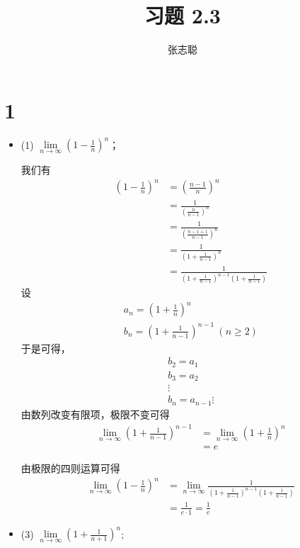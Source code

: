 \documentclass{article}
\begin{document}
\title{习题 2.3}
\author{张志聪}
\maketitle

\section*{1}

\begin{itemize}
  \item (1) $\lim\limits_{n \to \infty} \left(1 - \frac{1}{n}\right)^{n}$；

        我们有
        \begin{align*}
          \left(1 - \frac{1}{n}\right)^{n}
           & = \left(\frac{n - 1}{n}\right)^{n}                                                 \\
           & = \frac{1}{\left(\frac{n}{n - 1}\right)^{n}}                                       \\
           & = \frac{1}{\left(\frac{n-1+1}{n - 1}\right)^{n}}                                   \\
           & = \frac{1}{\left(1 + \frac{1}{n - 1}\right)^{n}}                                   \\
           & = \frac{1}{\left(1 + \frac{1}{n - 1}\right)^{n-1}\left(1 + \frac{1}{n - 1}\right)}
        \end{align*}
        设
        \begin{align*}
          a_n = \left(1 + \frac{1}{n}\right)^{n} \\
          b_n = \left(1 + \frac{1}{n - 1}\right)^{n-1} \ (n \geq 2)
        \end{align*}
        于是可得，
        \begin{align*}
          b_2 = a_1 \\
          b_3 = a_2 \\
          \vdots    \\
          b_n = a_{n-1}
          \vdots
        \end{align*}
        由数列改变有限项，极限不变可得
        \begin{align*}
          \lim\limits_{n \to \infty} \left(1 + \frac{1}{n - 1}\right)^{n-1}
           & = \lim\limits_{n \to \infty} \left(1 + \frac{1}{n}\right)^{n} \\
           & = e
        \end{align*}

        由极限的四则运算可得
        \begin{align*}
          \lim\limits_{n \to \infty} \left(1 - \frac{1}{n}\right)^{n}
           & = \lim\limits_{n \to \infty} \frac{1}{\left(1 + \frac{1}{n - 1}\right)^{n-1}\left(1 + \frac{1}{n - 1}\right)} \\
           & = \frac{1}{e \cdot 1} = \frac{1}{e}
        \end{align*}
  \item (3) $\lim\limits_{n \to \infty} \left(1 + \frac{1}{n + 1}\right)^n$;


\end{itemize}
\end{document}
